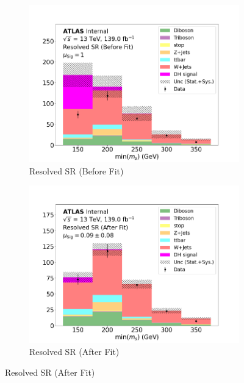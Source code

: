 \begin{figure}[h]
\begin{subfigure}{0.45\textwidth}
  \end{subfigure} \vspace{1em}
  \begin{subfigure}{0.45\textwidth}
    \includegraphics[width=\textwidth]{Figures/8/MonoSlep_monoSWWsemilep_zp1000_dm200_dh160/SR_Resolved_before.pdf}
    \caption{Resolved SR (Before Fit)}\label{fig:before_SR_merged_MonoSlep_monoSWWsemilep_zp1000_dm200_dh160}
  \end{subfigure} \hspace{1em}
  \begin{subfigure}{0.45\textwidth}
    \includegraphics[width=\textwidth]{Figures/8/MonoSlep_monoSWWsemilep_zp1000_dm200_dh160/SR_Resolved_after.pdf}
    \caption{Resolved SR (After Fit)}\label{fig:after_SR_merged_MonoSlep_monoSWWsemilep_zp1000_dm200_dh160}

\end{subfigure}
\end{figure}

